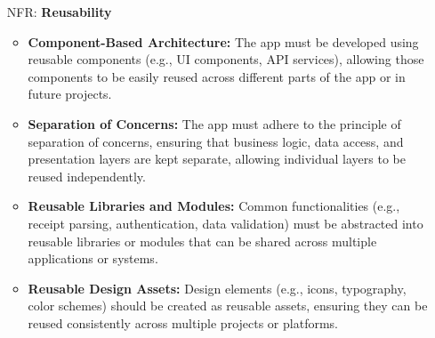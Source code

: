 \documentclass[12pt]{article}
\newcounter{frnum} %
\newcounter{nfrnum} %
\begin{document}
\begin{itemize}
\item[NFR\refstepcounter{nfrnum}\thenfrnum \label{NFR_Reuseability}:] \textbf{Reusability} 
\begin{itemize}
	\item \textbf{Component-Based Architecture:} The app must be developed using reusable components (e.g., UI components, API services), allowing those components to be easily reused across different parts of the app or in future projects.
	\item \textbf{Separation of Concerns:} The app must adhere to the principle of separation of concerns, ensuring that business logic, data access, and presentation layers are kept separate, allowing individual layers to be reused independently.
	\item \textbf{Reusable Libraries and Modules:} Common functionalities (e.g., receipt parsing, authentication, data validation) must be abstracted into reusable libraries or modules that can be shared across multiple applications or systems.
	\item \textbf{Reusable Design Assets:} Design elements (e.g., icons, typography, color schemes) should be created as reusable assets, ensuring they can be reused consistently across multiple projects or platforms.
\end{itemize}

\newpage


\end{itemize}
\end{document}
